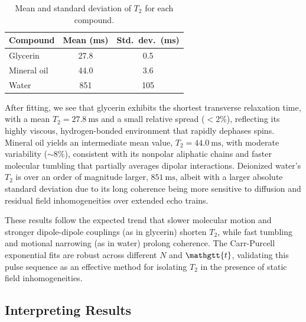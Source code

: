 \documentclass[
    floatfix,  %
    reprint,
    amsmath,
    amssymb,
    aps,
]{revtex4-2}
\newcommand{\taucode}{\mathgtt{t}}
\begin{document}
\begin{table}[htbp]
    \centering
    \caption{Mean and standard deviation of $T_2$ for each compound.}
    \label{tab:t2-stats}
    \setlength{\tabcolsep}{12pt}
    \begin{tabular}{l c c}
        \toprule
        Compound      & Mean (\si{\milli\second}) & Std.\ dev.\ (\si{\milli\second}) \\
        \midrule
        Glycerin      & 27.8    & 0.5    \\
        Mineral oil   & 44.0    & 3.6    \\
        Water         & 851     & 105    \\
        \bottomrule
    \end{tabular}
\end{table}

After fitting, we see that glycerin exhibits the shortest transverse relaxation time, with a mean $T_2 = \SI{27.8}{\milli\second}$ and a small relative spread ($<2\%$), reflecting its highly viscous, hydrogen-bonded environment that rapidly dephases spins. Mineral oil yields an intermediate mean value, $T_2 = \SI{44.0}{\milli\second}$, with moderate variability ($\sim8\%$), consistent with its nonpolar aliphatic chains and faster molecular tumbling that partially averages dipolar interactions. Deionized water's $T_2$ is over an order of magnitude larger, $\SI{851}{\milli\second}$, albeit with a larger absolute standard deviation due to its long coherence being more sensitive to diffusion and residual field inhomogeneities over extended echo trains.

These results follow the expected trend that slower molecular motion and stronger dipole-dipole couplings (as in glycerin) shorten $T_2$, while fast tumbling and motional narrowing (as in water) prolong coherence. The Carr-Purcell exponential fits are robust across different $N$ and $\taucode$, validating this pulse sequence as an effective method for isolating $T_2$ in the presence of static field inhomogeneities.













\subsection{Interpreting Results}
\end{document}
